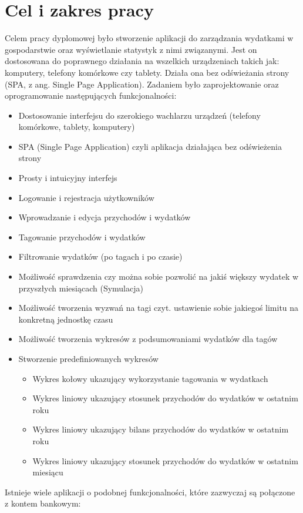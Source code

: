 \documentclass[10pt,titlepage]{article}
\begin{document}
\section{Cel i zakres pracy}
\par Celem pracy dyplomowej było stworzenie aplikacji do zarządzania wydatkami w gospodarstwie oraz wyświetlanie statystyk z nimi związanymi. Jest on dostosowana do poprawnego działania na wszelkich urządzeniach takich jak: komputery, telefony komórkowe czy tablety. Działa ona bez odświeżania strony (SPA, z ang. Single Page Application). Zadaniem było zaprojektowanie oraz oprogramowanie następujących funkcjonalności:
\begin{itemize}
  \item Dostosowanie interfejsu do szerokiego wachlarzu urządzeń (telefony komórkowe, tablety, komputery)
  \item SPA (Single Page Application) czyli aplikacja działająca bez odświeżenia strony
  \item Prosty i intuicyjny interfejs
  \item Logowanie i rejestracja użytkowników
  \item Wprowadzanie i edycja przychodów i wydatków
  \item Tagowanie przychodów i wydatków
  \item Filtrowanie wydatków (po tagach i po czasie)
  \item Możliwość sprawdzenia czy można sobie pozwolić na jakiś większy wydatek w przyszłych miesiącach (Symulacja)
  \item Możliwość tworzenia wyzwań na tagi czyt. ustawienie sobie jakiegoś limitu na konkretną jednostkę czasu
  \item Możliwość tworzenia wykresów z podsumowaniami wydatków dla tagów
  \item Stworzenie predefiniowanych wykresów
    \begin{itemize}
      \item Wykres kołowy ukazujący wykorzystanie tagowania w wydatkach
      \item Wykres liniowy ukazujący stosunek przychodów do wydatków w ostatnim roku
      \item Wykres liniowy ukazujący bilans przychodów do wydatków w ostatnim roku
      \item Wykres liniowy ukazujący stosunek przychodów do wydatków w ostatnim miesiącu
    \end{itemize}
\end{itemize}
Istnieje wiele aplikacji o podobnej funkcjonalności, które zazwyczaj są połączone z kontem bankowym:
\end{document}
